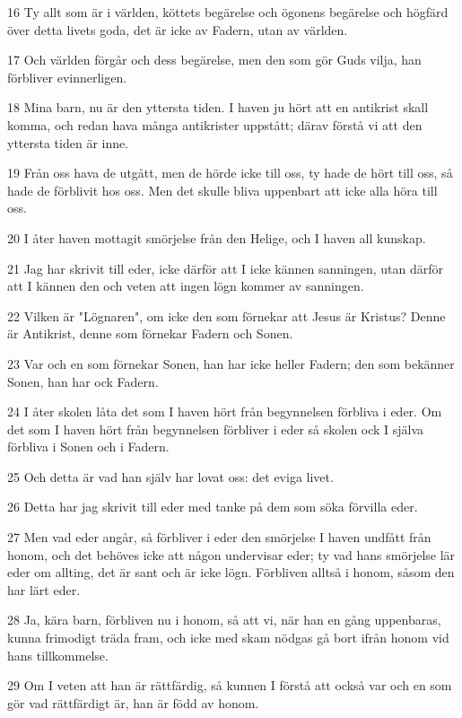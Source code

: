 \par 16 Ty allt som är i världen, köttets begärelse och ögonens begärelse och högfärd över detta livets goda, det är icke av Fadern, utan av världen.
\par 17 Och världen förgår och dess begärelse, men den som gör Guds vilja, han förbliver evinnerligen.
\par 18 Mina barn, nu är den yttersta tiden. I haven ju hört att en antikrist skall komma, och redan hava många antikrister uppstått; därav förstå vi att den yttersta tiden är inne.
\par 19 Från oss hava de utgått, men de hörde icke till oss, ty hade de hört till oss, så hade de förblivit hos oss. Men det skulle bliva uppenbart att icke alla höra till oss.
\par 20 I åter haven mottagit smörjelse från den Helige, och I haven all kunskap.
\par 21 Jag har skrivit till eder, icke därför att I icke kännen sanningen, utan därför att I kännen den och veten att ingen lögn kommer av sanningen.
\par 22 Vilken är "Lögnaren", om icke den som förnekar att Jesus är Kristus? Denne är Antikrist, denne som förnekar Fadern och Sonen.
\par 23 Var och en som förnekar Sonen, han har icke heller Fadern; den som bekänner Sonen, han har ock Fadern.
\par 24 I åter skolen låta det som I haven hört från begynnelsen förbliva i eder. Om det som I haven hört från begynnelsen förbliver i eder så skolen ock I själva förbliva i Sonen och i Fadern.
\par 25 Och detta är vad han själv har lovat oss: det eviga livet.
\par 26 Detta har jag skrivit till eder med tanke på dem som söka förvilla eder.
\par 27 Men vad eder angår, så förbliver i eder den smörjelse I haven undfått från honom, och det behöves icke att någon undervisar eder; ty vad hans smörjelse lär eder om allting, det är sant och är icke lögn. Förbliven alltså i honom, såsom den har lärt eder.
\par 28 Ja, kära barn, förbliven nu i honom, så att vi, när han en gång uppenbaras, kunna frimodigt träda fram, och icke med skam nödgas gå bort ifrån honom vid hans tillkommelse.
\par 29 Om I veten att han är rättfärdig, så kunnen I förstå att också var och en som gör vad rättfärdigt är, han är född av honom.

